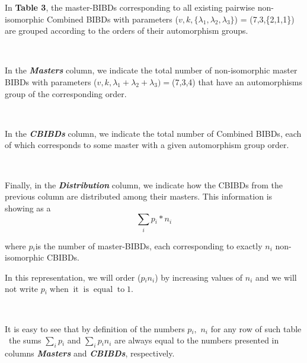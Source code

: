 \documentclass{article}
\newcommand{\nobracket}{}
\newcommand{\tmem}[1]{{\em #1\/}}
\newcommand{\tmop}[1]{\ensuremath{\operatorname{#1}}}
\newcommand{\tmstrong}[1]{\textbf{#1}}
\newenvironment{tmparmod}[3]{\begin{list}{}{\setlength{\topsep}{0pt}\setlength{\leftmargin}{#1}\setlength{\rightmargin}{#2}\setlength{\parindent}{#3}\setlength{\listparindent}{\parindent}\setlength{\itemindent}{\parindent}\setlength{\parsep}{\parskip}} \item[]}{\end{list}}
\begin{document}
\begin{tmparmod}{0pt}{0pt}{0tab}%
  In {\tmstrong{Table 3}}, the master-BIBDs corresponding to all existing
  pairwise non-isomorphic Combined BIBDs with parameters ($v, k, \{ \lambda
  {}_1, \lambda {}_2, \lambda {}_3 \}$) = (7,3,\{2,1,1\}) are grouped
  according to the orders of their automorphism groups.
  
  \
  
  In the {\tmstrong{{\tmem{Masters}}}} column, we indicate the total number
  of non-isomorphic master BIBDs with parameters ($v, k, \nobracket \lambda
  {}_1 + \lambda {}_2 + \lambda {}_3) =$(7,3,4) that have an automorphisms
  group of the corresponding order.
  
  \
  
  In the {\tmem{{\tmstrong{CBIBDs{\tmem{}}}}}} column, we indicate the total
  number of Combined BIBDs, each of which corresponds to some master with a
  given automorphism group order.
  
  \
  
  Finally, in the {\tmem{{\tmstrong{Distribution}}}} column, we indicate how
  the CBIBDs from the previous column are distributed among their masters.
  This information is showing as a
  \begin{equation}
    \underset{}{} \underset{i}{\sum} \underset{}{} p {}_i \ast n {}_i
  \end{equation}
  
\end{tmparmod}

\begin{tmparmod}{0pt}{0pt}{0tab}%
  where $p {}_i $is the number of master-BIBDs, each corresponding to exactly
  $n {}_i$ non-isomorphic CBIBDs. 
\end{tmparmod}

\begin{tmparmod}{0pt}{0pt}{0tab}%
  In this representation, we will order ($p {}_i n {}_i$) by increasing values
  of $n {}_i$ and we will not write $p {}_i \tmop{when} \tmop{it} \tmop{is}
  \tmop{equal} \tmop{to} 1.$
\end{tmparmod}

\

\begin{tmparmod}{0pt}{0pt}{0tab}%
  It is easy to see that by definition of the numbers $p {}_i,$ $n {}_i$ for
  any row of such table \ the sums $\underset{i}{\sum} \underset{}{} p {}_i$
  and $\underset{}{} \underset{i}{\sum} \underset{}{} p {}_i n {}_i $ are
  always equal to the numbers presented in columns
  {\tmem{{\tmstrong{Masters}}}} and {\tmem{{\tmstrong{CBIBDs}}}},
  respectively.
\end{tmparmod}
\end{document}
